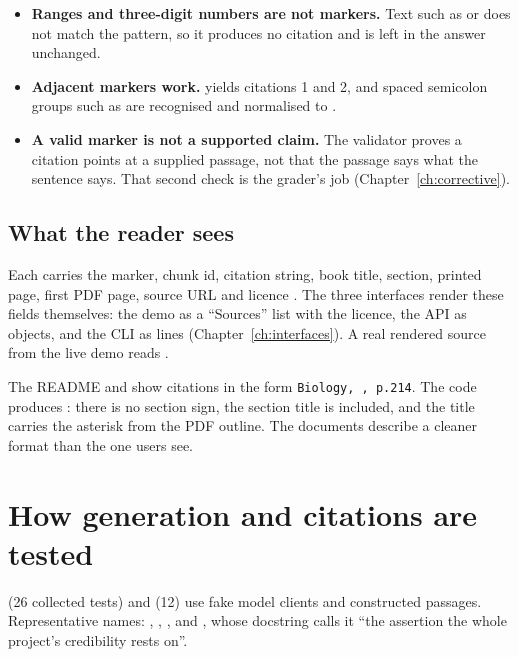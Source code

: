 \begin{itemize}
  \item \textbf{Ranges and three-digit numbers are not markers.} Text such as \code{[1-3]} or \code{[100]} does not match the pattern, so it produces no citation and is left in the answer unchanged.
  \item \textbf{Adjacent markers work.} \code{[1][2]} yields citations 1 and 2, and spaced semicolon groups such as \code{[ 4 ; 5 ]} are recognised and normalised to \code{[4, 5]}.
  \item \textbf{A valid marker is not a supported claim.} The validator proves a citation points at a supplied passage, not that the passage says what the sentence says. That second check is the grader's job (Chapter~\ref{ch:corrective}).
\end{itemize}

\subsection{What the reader sees}

Each  carries the marker, chunk id, citation string, book title, section, printed page, first PDF page, source URL and licence . The three interfaces render these fields themselves: the demo as a \enquote{Sources} list with the licence, the API as  objects, and the CLI as  lines (Chapter~\ref{ch:interfaces}). A real rendered source from the live demo reads .

\begin{finding}
The README and  show citations in the form \texttt{Biology, , p.214}. The code produces : there is no section sign, the section title is included, and the title carries the asterisk from the PDF outline. The documents describe a cleaner format than the one users see.
\end{finding}

\section{How generation and citations are tested}

 (26 collected tests) and  (12) use fake model clients and constructed passages. Representative names: , , ,  and , whose docstring calls it \enquote{the assertion the whole project's credibility rests on}.

